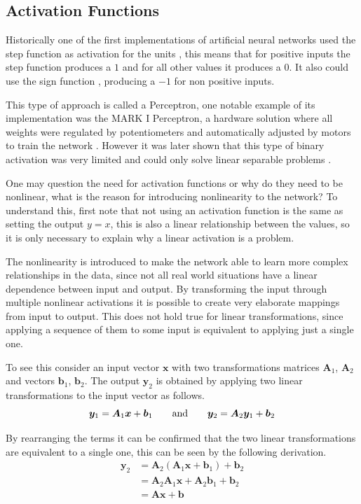 \subsection{Activation Functions}
Historically one of the first implementations of artificial neural networks used the step function as activation for the units \cite[Chapter 1]{NN&DL2015}, this means that for positive inputs the step function produces a $1$ and for all other values it produces a $0$. It also could use the sign function \cite{thePerceptron2017}, producing a $-1$ for non positive inputs.

This type of approach is called a Perceptron, one notable example of its implementation was the MARK I Perceptron, a hardware solution where all weights were regulated by potentiometers and automatically adjusted by motors to train the network \cite{perceptron1960}. However it was later shown that this type of binary activation was very limited and could only solve linear separable problems \cite{thePerceptron2017}.

One may question the need for activation functions or why do they need to be nonlinear, what is the reason for introducing nonlinearity to the network? To understand this, first note that not using an activation function is the same as setting the output $y = x$, this is also a linear relationship between the values, so it is only necessary to explain why a linear activation is a problem.

The nonlinearity is introduced to make the network able to learn more complex relationships in the data, since not all real world situations have a linear dependence between input and output. By transforming the input through multiple nonlinear activations it is possible to create very elaborate mappings from input to output. This does not hold true for linear transformations, since applying a sequence of them to some input is equivalent to applying just a single one.

To see this consider an input vector $\bm{x}$ with two transformations matrices $\bm{A}_1$, $\bm{A}_2$ and vectors $\bm{b}_1$, $\bm{b}_2$. The output $\bm{y}_2$ is obtained by applying two linear transformations to the input vector as follows.
\begin{equation} \label{eq:linearity_1}
    \bm{y}_1 = \bm{A}_1 \bm{x} + \bm{b}_1
    \qquad \text{and} \qquad
    \bm{y}_2 = \bm{A}_2 \bm{y}_1 + \bm{b}_2 \\
\end{equation}

By rearranging the terms it can be confirmed that the two linear transformations are equivalent to a single one, this can be seen by the following derivation.
\begin{align*}
    \bm{y}_2& = \bm{A}_2 (\bm{A}_1 \bm{x} + \bm{b}_1) + \bm{b}_2 \\
    & = \bm{A}_2 \bm{A}_1 \bm{x} +  \bm{A}_2 \bm{b}_1 + \bm{b}_2 \\
    & = \bm{A} \bm{x} + \bm{b}
\end{align*}

